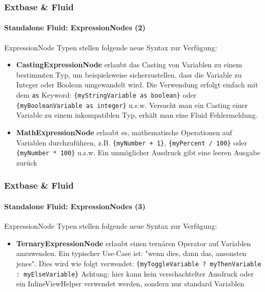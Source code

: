 \begin{frame}[fragile]
	\frametitle{Extbase \& Fluid}
	\framesubtitle{Standalone Fluid: ExpressionNodes (2)}

	ExpressionNode Typen stellen folgende neue Syntax zur Verfügung:

	\begin{itemize}

		\item \textbf{CastingExpressionNode}\newline
			\small
				erlaubt das Casting von Variablen zu einem bestimmten Typ, um beispielsweise sicherzustellen, dass die Variable zu Integer oder Boolean umgewandelt wird. Die Verwendung erfolgt einfach mit dem \texttt{as} Keyword:
				\texttt{\{myStringVariable as boolean\}} oder
				\texttt{\{myBooleanVariable as integer\}} u.s.w.
				Versucht man ein Casting einer Variable zu einem inkompatiblen Typ, erhält man eine Fluid Fehlermeldung.
			\normalsize

		\item \textbf{MathExpressionNode}\newline
			\small
				erlaubt es, mathematische Operationen auf Variablen durchzuführen, z.B.
				\texttt{\{myNumber + 1\}}, \texttt{\{myPercent / 100\}} oder
				\texttt{\{myNumber * 100\}} u.s.w.
				Ein unmöglicher Ausdruck gibt eine leeren Ausgabe zurück
			\normalsize

	\end{itemize}

\end{frame}


\begin{frame}[fragile]
	\frametitle{Extbase \& Fluid}
	\framesubtitle{Standalone Fluid: ExpressionNodes (3)}

	ExpressionNode Typen stellen folgende neue Syntax zur Verfügung:

	\begin{itemize}

		\item \textbf{TernaryExpressionNode}\newline
			\small
				erlaubt einen ternären Operator auf Variablen anzuwenden.
				Ein typischer Use-Case ist: "wenn dies, dann das, ansonsten jenes". Dies wird wie folgt verwendet:\newline
				\texttt{\{myToggleVariable ? myThenVariable : myElseVariable\}}\newline
				Achtung: hier kann kein verschachtelter Ausdruck oder ein InlineViewHelper verwendet werden, sondern nur standard Variablen
			\normalsize

	\end{itemize}

\end{frame}

